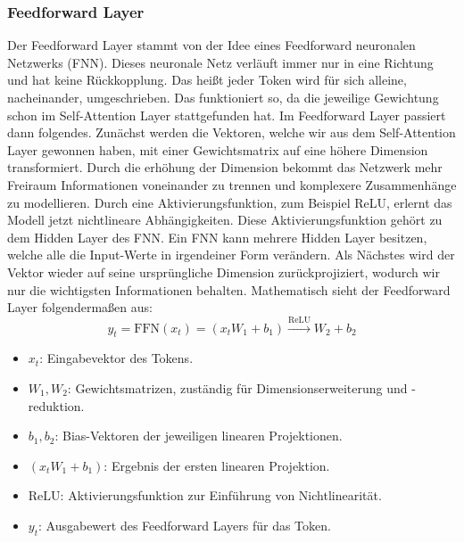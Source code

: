 \subsubsection{Feedforward Layer}
Der Feedforward Layer stammt von der Idee eines Feedforward neuronalen Netzwerks (FNN).
Dieses neuronale Netz verläuft immer nur in eine Richtung und hat keine Rückkopplung.
Das heißt jeder Token wird für sich alleine, nacheinander, umgeschrieben.
Das funktioniert so, da die jeweilige Gewichtung schon im Self-Attention Layer stattgefunden hat.
Im Feedforward Layer passiert dann folgendes.
Zunächst werden die Vektoren, welche wir aus dem Self-Attention Layer gewonnen haben,
mit einer Gewichtsmatrix auf eine höhere Dimension transformiert.
Durch die erhöhung der Dimension bekommt das Netzwerk mehr Freiraum Informationen voneinander zu trennen
und komplexere Zusammenhänge zu modellieren.
Durch eine Aktivierungsfunktion, zum Beispiel ReLU, erlernt das Modell jetzt nichtlineare Abhängigkeiten.
Diese Aktivierungsfunktion gehört zu dem Hidden Layer des FNN.
Ein FNN kann mehrere Hidden Layer besitzen, welche alle die Input-Werte in irgendeiner Form verändern.
Als Nächstes wird der Vektor wieder auf seine ursprüngliche Dimension zurückprojiziert,
wodurch wir nur die wichtigsten Informationen behalten.
Mathematisch sieht der Feedforward Layer folgendermaßen aus:
\[
y_t = \text{FFN}(x_t) = \left( x_t W_1 + b_1 \right) \xrightarrow{\text{ReLU}} W_2 + b_2
\]
\begin{itemize}
  \item $x_t$: Eingabevektor des Tokens.
  \item $W_1, W_2$: Gewichtsmatrizen, zuständig für Dimensionserweiterung und -reduktion.
  \item $b_1, b_2$: Bias-Vektoren der jeweiligen linearen Projektionen.
  \item $\left( x_t W_1 + b_1 \right)$: Ergebnis der ersten linearen Projektion.
  \item $\text{ReLU}$: Aktivierungsfunktion zur Einführung von Nichtlinearität.
  \item $y_t$: Ausgabewert des Feedforward Layers für das Token.
\end{itemize}


